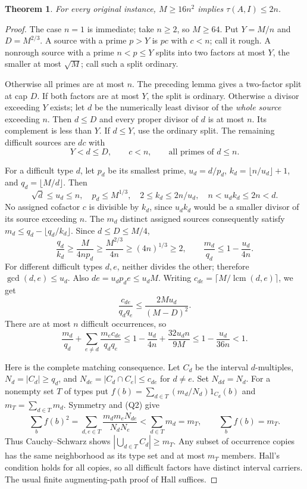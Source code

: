 \documentclass[11pt,a4paper]{article}
\newtheorem{theorem}{Theorem}[section]
\DeclareMathOperator{\lcm}{lcm}
\begin{document}
\begin{theorem}
For every original instance, $M\ge16n^2$ implies $\tau(A,I)\le2n$.
\end{theorem}
\begin{proof}
The case $n=1$ is immediate; take $n\ge2$, so $M\ge64$.
Put $Y=M/n$ and $D=M^{2/3}$. A source with a prime $p>Y$ is
$p c$ with $c<n$; call it rough. A nonrough source with a prime
$n<p\le Y$ splits into two factors at most $Y$, the smaller at most
$\sqrt M$; call such a split ordinary.

Otherwise all primes are at most $n$. The preceding lemma gives a
two-factor split at cap $D$. If both factors are at most $Y$, the split
is ordinary. Otherwise a divisor exceeding $Y$ exists; let $d$ be the
numerically least divisor of the \emph{whole source} exceeding $n$.
Then $d\le D$ and every proper divisor of $d$ is at most $n$.
Its complement is less than $Y$. If $d\le Y$, use the ordinary split.
The remaining difficult sources are $dc$ with
\[
 Y<d\le D,\qquad c<n,\qquad\text{all primes of }d\le n.
\]

For a difficult type $d$, let $p_d$ be its smallest prime,
$u_d=d/p_d$, $k_d=\lfloor n/u_d\rfloor+1$, and
$q_d=\lfloor M/d\rfloor$. Then
\[
 \sqrt d\le u_d\le n,\quad p_d\le M^{1/3},\quad
 2\le k_d\le2n/u_d,\quad n<u_dk_d\le2n<d.
\]
No assigned cofactor $c$ is divisible by $k_d$, since $u_dk_d$ would
be a smaller divisor of its source exceeding $n$.
The $m_d$ distinct assigned sources consequently satisfy
$m_d\le q_d-\lfloor q_d/k_d\rfloor$.
Since $d\le D\le M/4$,
\[
 \frac{q_d}{k_d}\ge\frac{M}{4np_d}
 \ge\frac{M^{2/3}}{4n}\ge(4n)^{1/3}\ge2,
 \qquad \frac{m_d}{q_d}\le1-\frac{u_d}{4n}.
 \tag{Q1}
\]
For different difficult types $d,e$, neither divides the other;
therefore $\gcd(d,e)\le u_d$. Also $de=u_dp_de\le u_dM$.
Writing $c_{de}=\lceil M/\lcm(d,e)\rceil$, we get
\[
 \frac{c_{de}}{q_dq_e}\le\frac{2Mu_d}{(M-D)^2}.
\]
There are at most $n$ difficult occurrences, so
\[
 \frac{m_d}{q_d}+\sum_{e\ne d}\frac{m_ec_{de}}{q_dq_e}
 \le1-\frac{u_d}{4n}+\frac{32u_dn}{9M}
 \le1-\frac{u_d}{36n}<1. \tag{Q2}
\]

Here is the complete matching consequence. Let $C_d$ be the interval
$d$-multiples, $N_d=|C_d|\ge q_d$, and
$N_{de}=|C_d\cap C_e|\le c_{de}$ for $d\ne e$. Set $N_{dd}=N_d$.
For a nonempty set $T$ of types put
$f(b)=\sum_{d\in T}(m_d/N_d)1_{C_d}(b)$ and $m_T=\sum_{d\in T}m_d$.
Symmetry and (Q2) give
\[
 \sum_b f(b)^2
 =\sum_{d,e\in T}\frac{m_dm_eN_{de}}{N_dN_e}
 <\sum_{d\in T}m_d=m_T,\qquad \sum_bf(b)=m_T.
\]
Thus Cauchy--Schwarz shows $|\bigcup_{d\in T}C_d|\ge m_T$.
Any subset of occurrence copies has the same neighborhood as its type
set and at most $m_T$ members. Hall's condition holds for all copies,
so all difficult factors have distinct interval carriers.
The usual finite augmenting-path proof of Hall suffices.


\end{proof}
\end{document}
